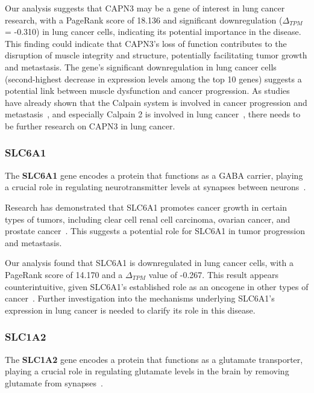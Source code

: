 Our analysis suggests that CAPN3 may be a gene of interest in lung cancer research,
with a PageRank score of 18.136 and significant downregulation ($\Delta_{TPM}$ = -0.310) in lung cancer cells,
indicating its potential importance in the disease.
This finding could indicate that CAPN3's loss of function contributes to the disruption of muscle integrity and structure,
potentially facilitating tumor growth and metastasis.
The gene's significant downregulation in lung cancer cells (second-highest decrease in expression levels among the top 10 genes)
suggests a potential link between muscle dysfunction and cancer progression.
As studies have already shown that the Calpain system is involved in cancer progression and metastasis~\cite{Storr2011Calpain},
and especially Calpain 2 is involved in lung cancer~\cite{Xu2019Calpain}, there needs to be further research on CAPN3 in lung cancer.
\newline

\subsubsection*{SLC6A1} \label{subsubsec:slc6a1}
The \textbf{SLC6A1} gene encodes a protein that functions as a GABA carrier,
playing a crucial role in regulating neurotransmitter levels at synapses between neurons~\cite{Chen2020SLC6A1}.

Research has demonstrated that SLC6A1 promotes cancer growth in certain types of tumors,
including clear cell renal cell carcinoma, ovarian cancer, and prostate cancer~\cite{Chen2020SLC6A1}.
This suggests a potential role for SLC6A1 in tumor progression and metastasis.

Our analysis found that SLC6A1 is downregulated in lung cancer cells,
with a PageRank score of 14.170 and a $\Delta_{TPM}$ value of -0.267.
This result appears counterintuitive, given SLC6A1's established role as an oncogene in other types of cancer~\cite{Chen2020SLC6A1}.
Further investigation into the mechanisms underlying SLC6A1's expression in lung cancer is needed to clarify its role in this disease.
\newline

\subsubsection*{SLC1A2} \label{subsubsec:slc1a2}
The \textbf{SLC1A2} gene encodes a protein that functions as a glutamate transporter,
playing a crucial role in regulating glutamate levels in the brain by removing glutamate from synapses~\cite{NCBI2017SLC1A2}.

